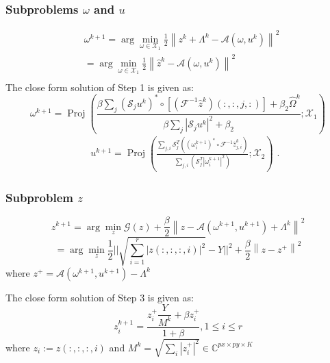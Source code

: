 \documentclass[UTF8]{beamer}
\begin{document}
\begin{frame}[c]\frametitle{Subproblems $\omega$ and $u$ }
	$$
	\begin{aligned}
	&\omega^{k+1}=\arg \min _{\omega \in \mathcal{X}_{1}} \frac{1}{2}\left\|z^{k} + \Lambda^k -\mathcal{A}\left(\omega, u^{k}\right)\right\|^{2}\\
	&=\arg \min _{\omega \in \mathcal{X}_{1}} \frac{1}{2}\left\|\hat{z}^{k}-\mathcal{A}\left(\omega, u^{k}\right)\right\|^{2}\\
	\end{aligned}
	$$
	The close form solution of Step 1 is given as:
\begin{equation}
\omega^{k+1}=\operatorname{Proj}\left(\frac{ \beta\sum_{j}\left(\mathcal{S}_{j} u^{k}\right)^{*} \circ [ \left(\mathcal{F}^{-1} \hat{z}^k\right)(:,:,j,:) ]
	+ \beta_2 \hat{\Omega}^k}{ \beta \sum_{j}\left|\mathcal{S}_{j} u^{k}\right|^{2}+\beta_2} ; \mathcal{X}_{1}\right)
\label{omegaup}
\end{equation}
\begin{equation}
\begin{aligned}
	&\quad u^{k+1}=\operatorname{Proj}\left(\frac{\sum_{j,i} \mathcal{S}_{j}^{T}\left(\left(\omega_i^{k+1}\right)^{*} \circ \mathcal{F}^{-1} \hat{z}_{j,i}^{k}\right)}{\sum_{j,i}\left(\mathcal{S}_{j}^{T}\left|\omega_i^{k+1}\right|^{2}\right)} ; \mathcal{X}_{2}\right) \text { . }
\end{aligned}
\label{uup}
\end{equation}

	
\end{frame}

\begin{frame}[c]\frametitle{Subproblem $z$ }
$$
z^{k+1}=\arg \min _{z} \mathcal{G}(z)+\frac{\beta}{2}\left\|z-\mathcal{A}\left(\omega^{k+1}, u^{k+1}\right)+\Lambda^{k}\right\|^{2}
$$
$$
=\arg \min _{z} \frac{1}{2}|| \sqrt{ \sum_{i=1}^{r} |z(:,:,:,i)|^2} - Y||^2+\frac{\beta}{2}\left\|z - z^+\right\|^{2}
$$
where $z^+ = \mathcal{A}\left(\omega^{k+1}, u^{k+1}\right) - \Lambda^{k}$


The  close form solution of Step 3 is given as:
\begin{equation}
z_i^{k+1} = \dfrac{z_i^+ \dfrac{Y}{ M^k} + \beta z_i^+}{1+\beta}, 1 \leq i \leq r
\label{zup}
\end{equation}
where $z_i:= z(:,:,:,i)$ and $M^k =\sqrt{\sum_i |z_i^+|^2} \in \mathbb{C}^{px \times py \times K}$
\end{frame}
\end{document}
